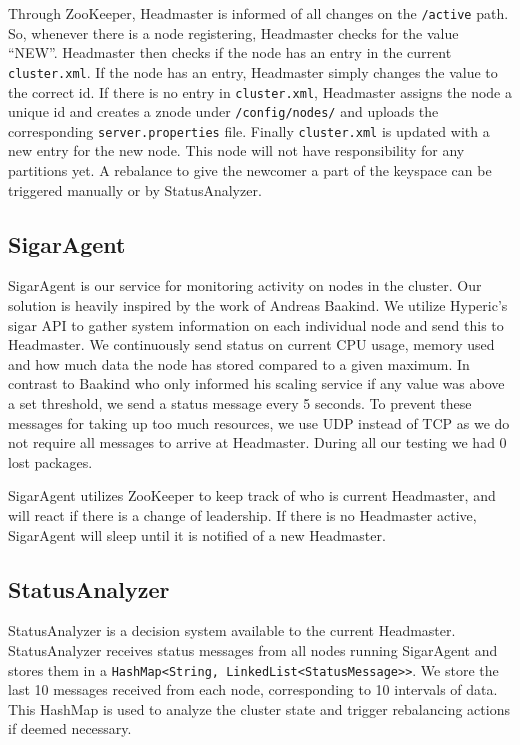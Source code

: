 Through ZooKeeper, Headmaster is informed of all changes on the \texttt{/active} path. So, whenever there is a node registering, Headmaster checks for the value ``NEW''. Headmaster then checks if the node has an entry in the current \texttt{cluster.xml}. If the node has an entry, Headmaster simply changes the value to the correct id. If there is no entry in \texttt{cluster.xml}, Headmaster assigns the node a unique id and creates a znode under \texttt{/config/nodes/} and uploads the corresponding \texttt{server.properties} file. Finally \texttt{cluster.xml} is updated with a new entry for the new node. This node will not have responsibility for any partitions yet. A rebalance to give the newcomer a part of the keyspace can be triggered manually or by StatusAnalyzer.

\subsection{SigarAgent}
SigarAgent is our service for monitoring activity on nodes in the cluster. Our solution is heavily inspired by the work of Andreas Baakind\cite{baakind}. We utilize Hyperic's sigar API to gather system information on each individual node and send this to Headmaster. We continuously send status on current CPU usage, memory used and how much data the node has stored compared to a given maximum. In contrast to Baakind who only informed his scaling service if any value was above a set threshold, we send a status message every 5 seconds. To prevent these messages for taking up too much resources, we use UDP instead of TCP as we do not require all messages to arrive at Headmaster. During all our testing we had 0 lost packages.

SigarAgent utilizes ZooKeeper to keep track of who is current Headmaster, and will react if there is a change of leadership. If there is no Headmaster active, SigarAgent will sleep until it is notified of a new Headmaster. 

\subsection{StatusAnalyzer}
StatusAnalyzer is a decision system available to the current Headmaster. StatusAnalyzer receives status messages from all nodes running SigarAgent and stores them in a \texttt{HashMap<String, LinkedList<StatusMessage>>}. We store the last 10 messages received from each node, corresponding to 10 intervals of data. This HashMap is used to analyze the cluster state and trigger rebalancing actions if deemed necessary.

